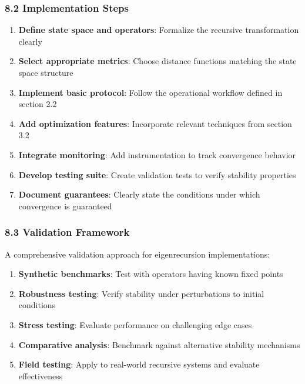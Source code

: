 \documentclass[
]{article}
\providecommand{\tightlist}{%
  \setlength{\itemsep}{0pt}\setlength{\parskip}{0pt}}
\begin{document}
\subsubsection{8.2 Implementation Steps}\label{implementation-steps}

\begin{enumerate}
\def\labelenumi{\arabic{enumi}.}
\tightlist
\item
  \textbf{Define state space and operators}: Formalize the recursive
  transformation clearly
\item
  \textbf{Select appropriate metrics}: Choose distance functions
  matching the state space structure
\item
  \textbf{Implement basic protocol}: Follow the operational workflow
  defined in section 2.2
\item
  \textbf{Add optimization features}: Incorporate relevant techniques
  from section 3.2
\item
  \textbf{Integrate monitoring}: Add instrumentation to track
  convergence behavior
\item
  \textbf{Develop testing suite}: Create validation tests to verify
  stability properties
\item
  \textbf{Document guarantees}: Clearly state the conditions under which
  convergence is guaranteed
\end{enumerate}

\subsubsection{8.3 Validation Framework}\label{validation-framework}

A comprehensive validation approach for eigenrecursion implementations:

\begin{enumerate}
\def\labelenumi{\arabic{enumi}.}
\tightlist
\item
  \textbf{Synthetic benchmarks}: Test with operators having known fixed
  points
\item
  \textbf{Robustness testing}: Verify stability under perturbations to
  initial conditions
\item
  \textbf{Stress testing}: Evaluate performance on challenging edge
  cases
\item
  \textbf{Comparative analysis}: Benchmark against alternative stability
  mechanisms
\item
  \textbf{Field testing}: Apply to real-world recursive systems and
  evaluate effectiveness
\end{enumerate}
\end{document}
